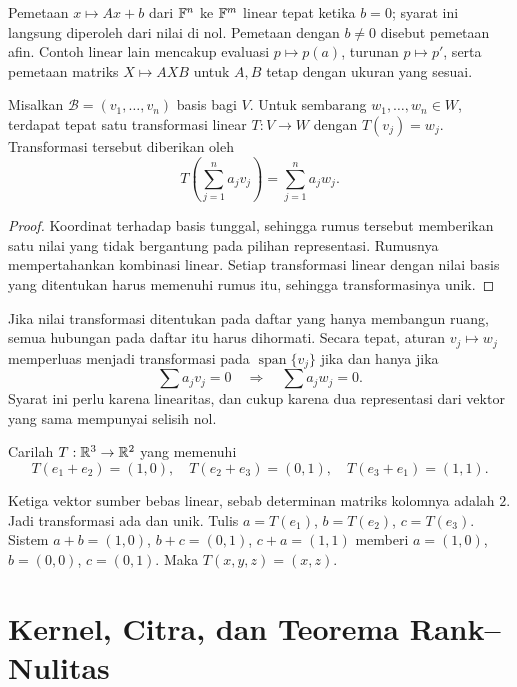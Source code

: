 Pemetaan $x\mapsto Ax+b$ dari $\mathbb{F}^n$ ke $\mathbb{F}^m$ linear tepat
ketika $b=0$; syarat ini langsung diperoleh dari nilai di nol.
Pemetaan dengan $b\ne0$ disebut pemetaan afin.
Contoh linear lain mencakup evaluasi $p\mapsto p(a)$,
turunan $p\mapsto p'$, serta pemetaan matriks $X\mapsto AXB$
untuk $A,B$ tetap dengan ukuran yang sesuai.

\begin{teorema}
    Misalkan $\mathcal B=(v_1,\ldots,v_n)$ basis bagi $V$.
    Untuk sembarang $w_1,\ldots,w_n\in W$, terdapat tepat satu
    transformasi linear $T:V\to W$ dengan $T(v_j)=w_j$.
    Transformasi tersebut diberikan oleh
    \[
        T\left(\sum_{j=1}^n a_jv_j\right)=\sum_{j=1}^n a_jw_j.
    \]
\end{teorema}
\begin{proof}
    Koordinat terhadap basis tunggal, sehingga rumus tersebut
    memberikan satu nilai yang tidak bergantung pada pilihan
    representasi. Rumusnya mempertahankan kombinasi linear.
    Setiap transformasi linear dengan nilai basis yang ditentukan
    harus memenuhi rumus itu, sehingga transformasinya unik.
\end{proof}

Jika nilai transformasi ditentukan pada daftar yang hanya
membangun ruang, semua hubungan pada daftar itu harus dihormati.
Secara tepat, aturan $v_j\mapsto w_j$ memperluas menjadi
transformasi pada $\operatorname{span}\{v_j\}$ jika dan hanya jika
\[
    \sum a_jv_j=0\quad\Longrightarrow\quad\sum a_jw_j=0.
\]
Syarat ini perlu karena linearitas, dan cukup karena dua
representasi dari vektor yang sama mempunyai selisih nol.

\begin{exam}
    Carilah $T:\mathbb{R}^3\to\mathbb{R}^2$ yang memenuhi
    \[
        T(e_1+e_2)=(1,0),\quad
        T(e_2+e_3)=(0,1),\quad
        T(e_3+e_1)=(1,1).
    \]
\end{exam}
\begin{solution}
    Ketiga vektor sumber bebas linear, sebab determinan matriks
    kolomnya adalah $2$. Jadi transformasi ada dan unik.
    Tulis $a=T(e_1)$, $b=T(e_2)$, $c=T(e_3)$.
    Sistem $a+b=(1,0)$, $b+c=(0,1)$, $c+a=(1,1)$
    memberi $a=(1,0)$, $b=(0,0)$, $c=(0,1)$.
    Maka $T(x,y,z)=(x,z)$.
\end{solution}

\section{Kernel, Citra, dan Teorema Rank--Nulitas}

